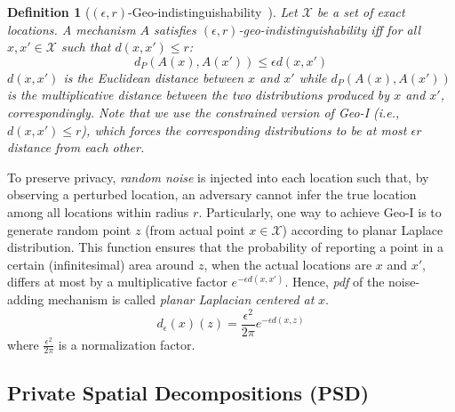 \documentclass{USC-Thesis}
\newcommand{\SCG}{{SCGuard}}
\numberwithin{equation}{chapter}
\begin{document}
\newtheorem{geo-indistinguishability}[definition]{Definition}\label{geo-indistinguishability}
\begin{geo-indistinguishability}[$(\epsilon,r)$-Geo-indistinguishability~\cite{andres2013geo}]
Let $\mathcal{X}$ be a set of exact locations. A mechanism $A$ satisfies $(\epsilon,r)$-geo-indistinguishability iff for all $\mathit{x,x'\in \mathcal{X}}$ such that $\mathit{d(x,x')\le r}$:
$$d_P(A(x), A(x'))\le \epsilon d(x, x')$$
$d(x,x')$ is the Euclidean distance between $x$ and $x'$ while $d_P(A(x), A(x'))$ is the multiplicative distance between the two distributions produced by $x$ and $x'$, correspondingly. Note that we use the \emph{constrained} version of Geo-I (i.e., $\mathit{d(x,x')\le r}$), which forces the corresponding distributions to be at most $\epsilon r$ distance from each other.
\end{geo-indistinguishability}

To preserve privacy, \emph{random noise} is injected into each location such that, by observing a perturbed location, an adversary cannot infer the true location among all locations within radius $r$.
Particularly, one way to achieve Geo-I is to generate random point $z$ (from actual point $x\in \mathcal{X}$) according to planar Laplace distribution. This function ensures that the probability of reporting a point in a certain (infinitesimal) area around $z$, when the actual locations are $x$ and $x'$, differs at most by a multiplicative factor $e^{-\epsilon d(x,x')}$. Hence, \emph{pdf} of the noise-adding mechanism is called \emph{planar Laplacian centered at} $x$.
\begin{equation}
d_\epsilon(x)(z)=\frac{\epsilon^2}{2\pi}e^{-\epsilon d(x,z)}
\label{eq:pdf}
\end{equation}
where $\frac{\epsilon^2}{2\pi}$ is a normalization factor.


\subsection{Private Spatial Decompositions (PSD)}
\label{sec:PSD-prelim}
\end{document}

